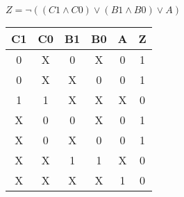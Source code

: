 
\begin{center}
    {\(Z = \lnot ((C1 \land C0) \lor (B1 \land B0) \lor A) \)}
    \begin{table}[h] %
        \begin{center}
            \begin{tabular}{|c|c|c|c|c||c|} \hline
            C1 & C0 & B1 & B0 & A & Z \\ \hline\hline
            0  & X  & 0  & X  & 0 & 1 \\ \hline
            0  & X  & X  & 0  & 0 & 1 \\ \hline
            1  & 1  & X  & X  & X & 0 \\ \hline
            X  & 0  & 0  & X  & 0 & 1 \\ \hline
            X  & 0  & X  & 0  & 0 & 1 \\ \hline
            X  & X  & 1  & 1  & X & 0 \\ \hline
            X  & X  & X  & X  & 1 & 0 \\ \hline
            \end{tabular}
        \end{center}
    \end{table}
\end{center}
